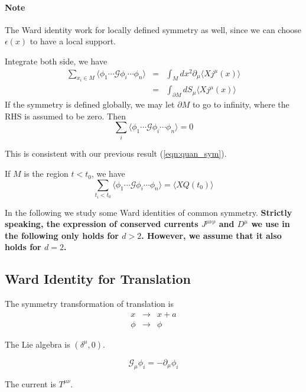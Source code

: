 \documentclass[12pt]{book}
\begin{document}
	\paragraph{Note} The Ward identity work for locally defined symmetry as well, since we can choose $\epsilon(x)$ to have a local support.
	
	Integrate both side, we have
	\begin{eqnarray}
		\sum_{x_i\in M}\langle\phi_1\cdots\mathcal G\phi_i\cdots\phi_n\rangle &=& \int_M dx^2\partial_\mu\langle Xj^\mu(x)\rangle\\
		&=& \int_{\partial M} dS_\mu\langle Xj^\mu(x)\rangle
	\end{eqnarray}
	If the symmetry is defined globally, we may let $\partial M$ to go to infinity, where the RHS is assumed to be zero. Then
	\begin{equation}
		\sum_i\langle\phi_1\cdots\mathcal G\phi_i\cdots\phi_n\rangle=0
	\end{equation}
	
	This is consistent with our previous result (\ref{eqn:quan_sym}).
	
	If $M$ is the region $t<t_0$, we have
	\begin{equation}
		\sum_{t_i<t_0}\langle\phi_1\cdots\mathcal G\phi_i\cdots\phi_n\rangle = \langle XQ(t_0)\rangle
	\end{equation}
	
	In the following we study some Ward identities of common symmetry. {\bf Strictly speaking, the expression of conserved currents $J^{\mu\nu\rho}$ and $D^\mu$ we use in the following only holds for $d>2$. However, we assume that it also holds for $d=2$.}
	
	\subsection{Ward Identity for Translation}
	
	The symmetry transformation of translation is
	\begin{eqnarray}
		x&\rightarrow &x+a\\
		\phi&\rightarrow&\phi		
	\end{eqnarray}
	
	The Lie algebra is $(\delta^\mu,0)$.
	
	\begin{equation}
		\mathcal G_\mu\phi_i=-\partial_\mu\phi_i
	\end{equation}
	
	The current is $T^{\mu\nu}$.
	
\end{document}
